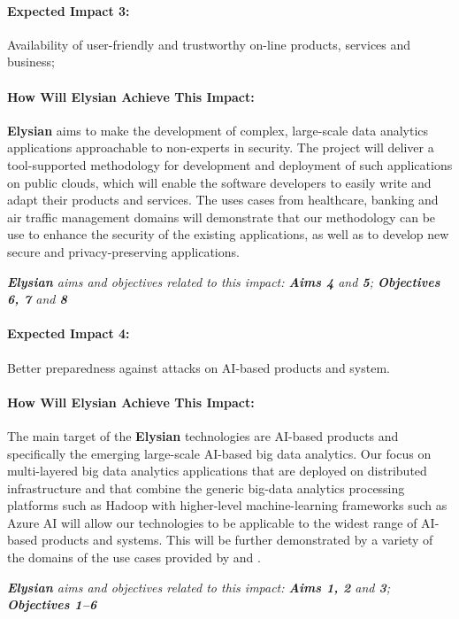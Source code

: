 \documentclass[a4paper,11pt]{article}
\newcommand{\project}[1]{\textbf{#1}\xspace}
\newcommand{\SECURITY}{\project{Elysian}}
\newcommand{\TheProject}{\SECURITY}
\begin{document}
\begin{mdframed}[backgroundcolor=blue!5]
\paragraph{Expected Impact 3:}
Availability of user-friendly and trustworthy on-line products, services and business;
\end{mdframed}

\begin{mdframed}[backgroundcolor=gray!10]
\paragraph{How Will \TheProject{} Achieve This Impact:}
\TheProject{} aims to make the development of complex, large-scale data analytics applications approachable to non-experts in security. The project will deliver a tool-supported methodology for development and deployment of such applications on public clouds, which will enable the software developers to easily write and adapt their products and services. The uses cases from healthcare, banking and air traffic management domains will demonstrate that our methodology can be use to enhance the security of the existing applications, as well as to develop new secure and privacy-preserving applications.

\emph{\TheProject{} aims and objectives related to this impact: \textbf{Aims 4}  and \textbf{5}; \textbf{Objectives 6, 7} and \textbf{8} }

\end{mdframed}

\begin{mdframed}[backgroundcolor=blue!5]
\paragraph{Expected Impact 4:}
Better preparedness against attacks on AI-based products and system.
\end{mdframed}

\begin{mdframed}[backgroundcolor=gray!10]
\paragraph{How Will \TheProject{} Achieve This Impact:}
The main target of the \TheProject{} technologies are AI-based products and specifically the emerging large-scale AI-based big data analytics. Our focus on multi-layered big data analytics applications that are deployed on distributed infrastructure and that combine the generic big-data analytics processing platforms such as Hadoop with higher-level machine-learning frameworks such as Azure AI will allow our technologies to be applicable to the widest range of AI-based products and systems. This will be further demonstrated by a variety of the domains of the use cases provided by \SOPRAshort{} and \FRQshort{}. 

\emph{\TheProject{} aims and objectives related to this impact: \textbf{Aims 1, 2} and \textbf{3}; \textbf{Objectives 1--6}}
\end{mdframed}
\end{document}
